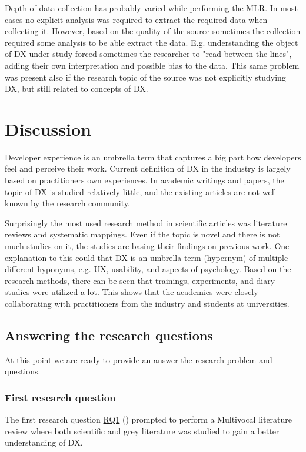 \documentclass[english, 12pt, a4paper, sci, utf8, a-1b, online]{aaltothesis}
\begin{document}
Depth of data collection has probably varied while performing the MLR. In most cases no explicit analysis was required to extract the required data when collecting it. However, based on the quality of the source sometimes the collection required some analysis to be able extract the data. E.g. understanding the object of DX under study forced sometimes the researcher to "read between the lines", adding their own interpretation and possible bias to the data. This same problem was present also if the research topic of the source was not explicitly  studying DX, but still related to concepts of DX.

\clearpage
\section{Discussion}

Developer experience is an umbrella term that captures a big part how developers feel and perceive their work. Current definition of DX in the industry is largely based on practitioners own experiences. In academic writings and papers, the topic of DX is studied relatively little, and the existing articles are not well known by the research community.

Surprisingly the most used research method in scientific articles was literature reviews and systematic mappings. Even if the topic is novel and there is not much studies on it, the studies are basing their findings on previous work. One explanation to this could that DX is an umbrella term (hypernym) of multiple different hyponyms, e.g. UX, usability, and aspects of psychology. Based on the research methods, there can be seen that trainings, experiments, and diary studies were utilized a lot. This shows that the academics were closely collaborating with practitioners from the industry and students at universities.

\subsection{Answering the research questions}

At this point we are ready to provide an answer the research problem and questions.

\subsubsection{First research question}

The first research question \hyperref[RQ1]{RQ1} (\rqone) prompted to perform a Multivocal literature review where both scientific and grey literature was studied to gain a better understanding of DX.
\end{document}
